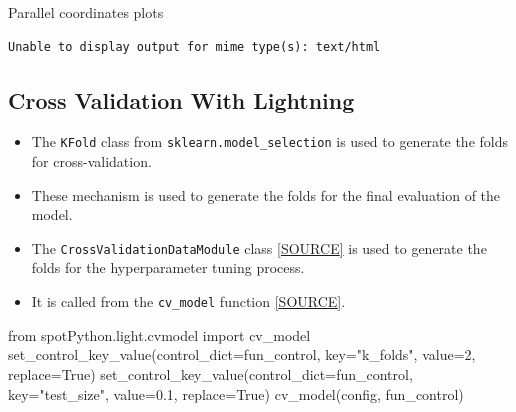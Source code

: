 \documentclass[
  letterpaper,
  DIV=11,
  numbers=noendperiod]{scrreprt}
\newenvironment{Shaded}{\begin{snugshade}}{\end{snugshade}}
\newcommand{\DecValTok}[1]{\textcolor[rgb]{0.68,0.00,0.00}{#1}}
\newcommand{\FloatTok}[1]{\textcolor[rgb]{0.68,0.00,0.00}{#1}}
\newcommand{\ImportTok}[1]{\textcolor[rgb]{0.00,0.46,0.62}{#1}}
\newcommand{\NormalTok}[1]{\textcolor[rgb]{0.00,0.23,0.31}{#1}}
\newcommand{\OperatorTok}[1]{\textcolor[rgb]{0.37,0.37,0.37}{#1}}
\newcommand{\StringTok}[1]{\textcolor[rgb]{0.13,0.47,0.30}{#1}}
\newcommand{\VariableTok}[1]{\textcolor[rgb]{0.07,0.07,0.07}{#1}}
\providecommand{\tightlist}{%
  \setlength{\itemsep}{0pt}\setlength{\parskip}{0pt}}\usepackage{longtable,booktabs,array}
\begin{document}
Parallel coordinates plots

\begin{verbatim}
Unable to display output for mime type(s): text/html
\end{verbatim}

\subsection{Cross Validation With
Lightning}\label{cross-validation-with-lightning-1}

\begin{itemize}
\tightlist
\item
  The \texttt{KFold} class from \texttt{sklearn.model\_selection} is
  used to generate the folds for cross-validation.
\item
  These mechanism is used to generate the folds for the final evaluation
  of the model.
\item
  The \texttt{CrossValidationDataModule} class
  \href{https://github.com/sequential-parameter-optimization/spotPython/blob/main/src/spotPython/data/lightcrossvalidationdatamodule.py}{{[}SOURCE{]}}
  is used to generate the folds for the hyperparameter tuning process.
\item
  It is called from the \texttt{cv\_model} function
  \href{https://github.com/sequential-parameter-optimization/spotPython/blob/main/src/spotPython/light/cvmodel.py}{{[}SOURCE{]}}.
\end{itemize}

\begin{Shaded}
\begin{Highlighting}[]
\ImportTok{from}\NormalTok{ spotPython.light.cvmodel }\ImportTok{import}\NormalTok{ cv\_model}
\NormalTok{set\_control\_key\_value(control\_dict}\OperatorTok{=}\NormalTok{fun\_control,}
\NormalTok{                        key}\OperatorTok{=}\StringTok{"k\_folds"}\NormalTok{,}
\NormalTok{                        value}\OperatorTok{=}\DecValTok{2}\NormalTok{,}
\NormalTok{                        replace}\OperatorTok{=}\VariableTok{True}\NormalTok{)}
\NormalTok{set\_control\_key\_value(control\_dict}\OperatorTok{=}\NormalTok{fun\_control,}
\NormalTok{                        key}\OperatorTok{=}\StringTok{"test\_size"}\NormalTok{,}
\NormalTok{                        value}\OperatorTok{=}\FloatTok{0.1}\NormalTok{,}
\NormalTok{                        replace}\OperatorTok{=}\VariableTok{True}\NormalTok{)}
\NormalTok{cv\_model(config, fun\_control)}
\end{Highlighting}
\end{Shaded}
\end{document}
